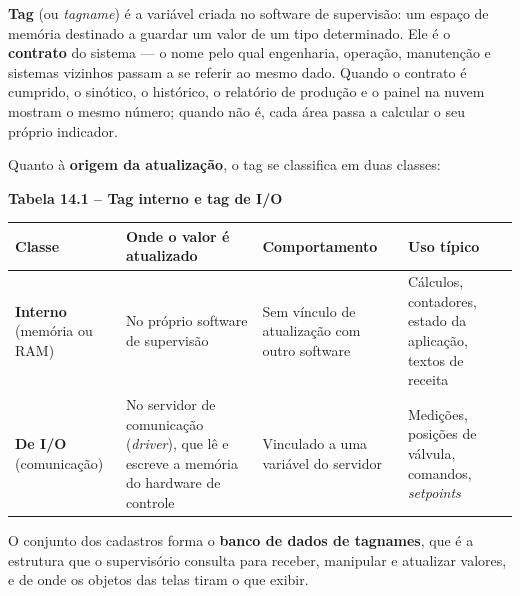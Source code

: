 \textbf{Tag} (ou \emph{tagname}) é a variável criada no software de supervisão: um espaço de memória destinado a guardar um valor de um tipo determinado. Ele é o \textbf{contrato} do sistema --- o nome pelo qual engenharia, operação, manutenção e sistemas vizinhos passam a se referir ao mesmo dado. Quando o contrato é cumprido, o sinótico, o histórico, o relatório de produção e o painel na nuvem mostram o mesmo número; quando não é, cada área passa a calcular o seu próprio indicador.

Quanto à \textbf{origem da atualização}, o tag se classifica em duas classes:

\textbf{Tabela 14.1 -- Tag interno e tag de I/O}

\begin{longtable}[]{@{}
  >{\raggedright\arraybackslash}p{}
  >{\raggedright\arraybackslash}p{}
  >{\raggedright\arraybackslash}p{}
  >{\raggedright\arraybackslash}p{}@{}}
\toprule\noalign{}
\begin{minipage}[b]{\linewidth}\raggedright
Classe
\end{minipage} & \begin{minipage}[b]{\linewidth}\raggedright
Onde o valor é atualizado
\end{minipage} & \begin{minipage}[b]{\linewidth}\raggedright
Comportamento
\end{minipage} & \begin{minipage}[b]{\linewidth}\raggedright
Uso típico
\end{minipage} \\
\midrule\noalign{}
\endhead
\bottomrule\noalign{}
\endlastfoot
\textbf{Interno} (memória ou RAM) & No próprio software de supervisão & Sem vínculo de atualização com outro software & Cálculos, contadores, estado da aplicação, textos de receita \\
\textbf{De I/O} (comunicação) & No servidor de comunicação (\emph{driver}), que lê e escreve a memória do hardware de controle & Vinculado a uma variável do servidor & Medições, posições de válvula, comandos, \emph{setpoints} \\
\end{longtable}

O conjunto dos cadastros forma o \textbf{banco de dados de tagnames}, que é a estrutura que o supervisório consulta para receber, manipular e atualizar valores, e de onde os objetos das telas tiram o que exibir.

